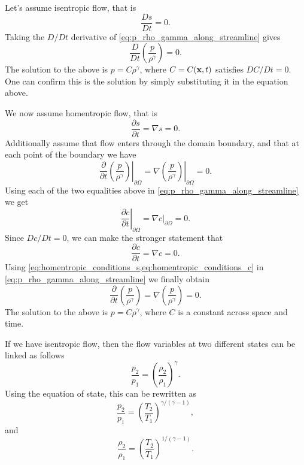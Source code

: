 \documentclass[oneside,a4paper,11pt]{report}
\begin{document}
Let's assume isentropic flow, that is 
\begin{equation*}
\frac{Ds}{Dt} = 0. 
\end{equation*}
Taking the $D/Dt$ derivative of \cref{eq:p_rho_gamma_along_streamline} gives
\begin{equation}
    \label{eq:p_rho_gamma_isentropic}
    \frac{D}{Dt} \left ( \frac{p}{\rho^\gamma} \right ) = 0.
\end{equation}
The solution to the above is $p = C \rho^\gamma$, where $C = C(\mathbf{x},t)$ satisfies $DC/Dt = 0$. One can confirm this is the solution by simply substituting it in the equation above.

We now assume homentropic flow, that is 
\begin{equation}
    \label{eq:homentropic_conditions_s}
    \frac{\partial s}{\partial t} = \nabla s = 0.
\end{equation}
Additionally assume that flow enters through the domain boundary, and that at each point of the boundary we have
\begin{equation*}
    \left . \frac{\partial}{\partial t} \left ( \frac{p}{\rho^\gamma} \right ) \right |_{\partial \Omega} = \left . \nabla \left ( \frac{p}{\rho^\gamma} \right ) \right |_{\partial \Omega} = 0.
\end{equation*}
Using each of the two equalities above in \cref{eq:p_rho_gamma_along_streamline} we get
\begin{equation*}
    \left . \frac{\partial c}{\partial t} \right |_{\partial \Omega} = \left . \nabla c \right |_{\partial \Omega} = 0.
\end{equation*}
Since $Dc/Dt=0$, we can make the stronger statement that
\begin{equation}
    \label{eq:homentropic_conditions_c}
    \frac{\partial c}{\partial t} = \nabla c = 0.
\end{equation}
Using \cref{eq:homentropic_conditions_s,eq:homentropic_conditions_c} in \cref{eq:p_rho_gamma_along_streamline} we finally obtain
\begin{equation}
    \label{eq:p_rho_gamma_homentropic}
    \frac{\partial}{\partial t} \left ( \frac{p}{\rho^\gamma} \right ) = \nabla \left ( \frac{p}{\rho^\gamma} \right ) = 0.
\end{equation}
The solution to the above is $p = C \rho^\gamma$, where $C$ is a constant across space and time.

If we have isentropic flow, then the flow variables at two different states can be linked as follows
\begin{equation}
\label{eq:isentropic_relation_perfect_gas_1}
    \frac{p_2}{p_1} = \left(\frac{\rho_2}{\rho_1} \right)^\gamma.
\end{equation}
Using the equation of state, this can be rewritten as
\begin{equation}
\label{eq:isentropic_relation_perfect_gas_2}
    \frac{p_2}{p_1} = \left ( \frac{T_2}{T_1} \right)^{\gamma/(\gamma-1)},
\end{equation}
and
\begin{equation}
\label{eq:isentropic_relation_perfect_gas_3}
    \frac{\rho_2}{\rho_1} = \left ( \frac{T_2}{T_1} \right)^{1/(\gamma-1)}.
\end{equation}
\end{document}
